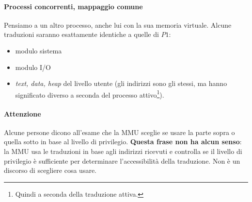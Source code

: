 \paragraph{Processi concorrenti, mappaggio comune}
Pensiamo a un altro processo, anche lui con la sua memoria virtuale. Alcune traduzioni saranno esattamente identiche a quelle di $P1$:
\begin{itemize}
	\item modulo sistema
	\item modulo I/O
	\item \textit{text, data, heap} del livello utente (gli indirizzi sono gli stessi, ma hanno significato diverso a seconda del processo attivo\footnote{Quindi a seconda della traduzione attiva.}).
\end{itemize}
\paragraph{Attenzione} Alcune persone dicono all'esame che la MMU sceglie se usare la parte sopra o quella sotto in base al livello di privilegio. \textbf{Questa frase non ha alcun senso}: la MMU usa le traduzioni in base agli indirizzi ricevuti e controlla se il livello di privilegio è sufficiente per determinare l'accessibilità della traduzione. Non è un discorso di scegliere cosa usare.



